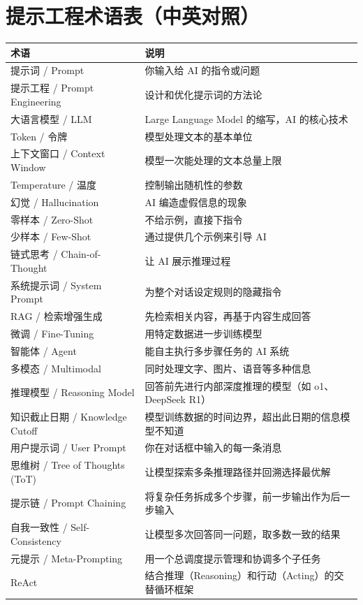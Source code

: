 \chapter{提示工程术语表（中英对照）}
\label{ch:glossary}

\begin{center}
\begin{tabular}{p{4.5cm}p{8cm}}
  \toprule
  \textbf{术语} & \textbf{说明} \\
  \midrule
  提示词 / Prompt & 你输入给 AI 的指令或问题 \\
  提示工程 / Prompt Engineering & 设计和优化提示词的方法论 \\
  大语言模型 / LLM & Large Language Model 的缩写，AI 的核心技术 \\
  Token / 令牌 & 模型处理文本的基本单位 \\
  上下文窗口 / Context Window & 模型一次能处理的文本总量上限 \\
  Temperature / 温度 & 控制输出随机性的参数 \\
  幻觉 / Hallucination & AI 编造虚假信息的现象 \\
  零样本 / Zero-Shot & 不给示例，直接下指令 \\
  少样本 / Few-Shot & 通过提供几个示例来引导 AI \\
  链式思考 / Chain-of-Thought & 让 AI 展示推理过程 \\
  系统提示词 / System Prompt & 为整个对话设定规则的隐藏指令 \\
  RAG / 检索增强生成 & 先检索相关内容，再基于内容生成回答 \\
  微调 / Fine-Tuning & 用特定数据进一步训练模型 \\
  智能体 / Agent & 能自主执行多步骤任务的 AI 系统 \\
  多模态 / Multimodal & 同时处理文字、图片、语音等多种信息 \\
  推理模型 / Reasoning Model & 回答前先进行内部深度推理的模型（如 o1、DeepSeek R1） \\
  知识截止日期 / Knowledge Cutoff & 模型训练数据的时间边界，超出此日期的信息模型不知道 \\
  用户提示词 / User Prompt & 你在对话框中输入的每一条消息 \\
  思维树 / Tree of Thoughts (ToT) & 让模型探索多条推理路径并回溯选择最优解 \\
  提示链 / Prompt Chaining & 将复杂任务拆成多个步骤，前一步输出作为后一步输入 \\
  自我一致性 / Self-Consistency & 让模型多次回答同一问题，取多数一致的结果 \\
  元提示 / Meta-Prompting & 用一个总调度提示管理和协调多个子任务 \\
  ReAct & 结合推理（Reasoning）和行动（Acting）的交替循环框架 \\
  \bottomrule
\end{tabular}
\end{center}


